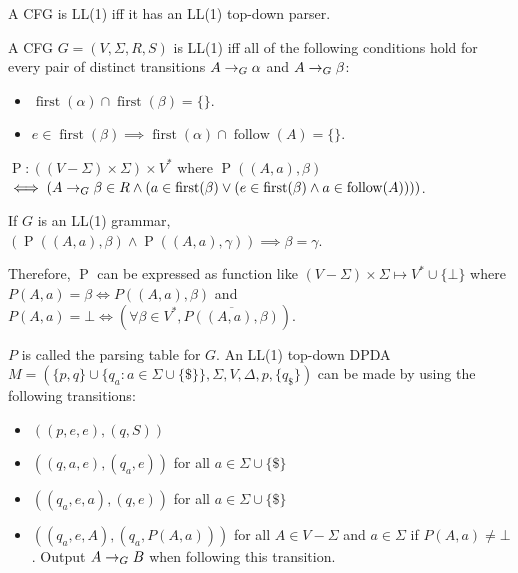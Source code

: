 A CFG is LL(1) iff it has an LL(1) top-down parser.

\begin{theorem}
A CFG $G = (V, \Sigma, R, S)$ is LL(1) iff all of the following conditions hold for every
pair of distinct transitions $A \rightarrow_{G} \alpha$ and $A \rightarrow_{G} \beta$:
\begin{itemize}
\item $\operatorname{first}(\alpha) \cap \operatorname{first}(\beta) = \{\}$.
\item $e \in \operatorname{first}(\beta) \implies \operatorname{first}(\alpha) \cap \operatorname{follow}(A) = \{\}$.
\end{itemize}
\end{theorem}

\begin{definition}
$\operatorname{P}: ((V-\Sigma) \times \Sigma) \times V^*$ where
$\operatorname{P}((A, a), \beta)$\\
$\iff (A \rightarrow_{G} \beta \in R \wedge
(a \in \operatorname{first}(\beta) \vee (e \in \operatorname{first}(\beta) \wedge a \in \operatorname{follow}(A))))$.
\end{definition}

\begin{theorem}
If $G$ is an LL(1) grammar,\\
$(\operatorname{P}((A, a), \beta) \wedge \operatorname{P}((A, a), \gamma)) \implies \beta = \gamma$.\\
\end{theorem}
Therefore, $\operatorname{P}$ can be expressed as function like $(V-\Sigma) \times \Sigma \mapsto V^* \cup \{\bot\}$
where $P(A, a) = \beta \iff P((A, a), \beta)$ and $P(A, a) = \bot \iff (\forall \beta \in V^*, \overline{P((A, a), \beta)})$.

$P$ is called the parsing table for $G$.
An LL(1) top-down DPDA
$M = (\{p, q\}\cup\{q_a: a \in \Sigma \cup \{\$\}\}, \Sigma, V, \Delta, p, \{q_{\$}\})$
can be made by using the following transitions:
\begin{itemize}
\item $((p, e, e), (q, S))$
\item $((q, a, e), (q_a, e))$ for all $a \in \Sigma \cup \{\$\}$
\item $((q_a, e, a), (q, e))$ for all $a \in \Sigma \cup \{\$\}$
\item $((q_a, e, A), (q_a, P(A, a)))$ for all $A \in V-\Sigma$ and $a \in \Sigma$
    if $P(A, a) \neq \bot$. Output $A \rightarrow_{G} B$ when following this transition.
\end{itemize}

